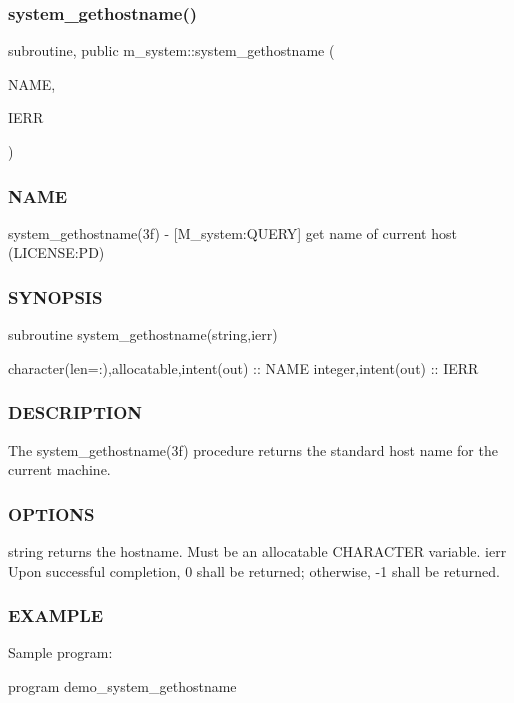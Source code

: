 \subsubsection{\texorpdfstring{system\+\_\+gethostname()}{system\_gethostname()}}
{\footnotesize\ttfamily subroutine, public m\+\_\+system\+::system\+\_\+gethostname (\begin{DoxyParamCaption}\item[{character(len=\+:), intent(out), allocatable}]{N\+A\+ME,  }\item[{integer, intent(out)}]{I\+E\+RR }\end{DoxyParamCaption})}



\subsubsection*{N\+A\+ME}

system\+\_\+gethostname(3f) -\/ \mbox{[}M\+\_\+system\+:Q\+U\+E\+RY\mbox{]} get name of current host (L\+I\+C\+E\+N\+SE\+:PD) \subsubsection*{S\+Y\+N\+O\+P\+S\+IS}

subroutine system\+\_\+gethostname(string,ierr)

character(len=\+:),allocatable,intent(out) \+:\+: N\+A\+ME integer,intent(out) \+:\+: I\+E\+RR \subsubsection*{D\+E\+S\+C\+R\+I\+P\+T\+I\+ON}

The system\+\_\+gethostname(3f) procedure returns the standard host name for the current machine.

\subsubsection*{O\+P\+T\+I\+O\+NS}

string returns the hostname. Must be an allocatable C\+H\+A\+R\+A\+C\+T\+ER variable. ierr Upon successful completion, 0 shall be returned; otherwise, -\/1 shall be returned. \subsubsection*{E\+X\+A\+M\+P\+LE}

Sample program\+:

program demo\+\_\+system\+\_\+gethostname

